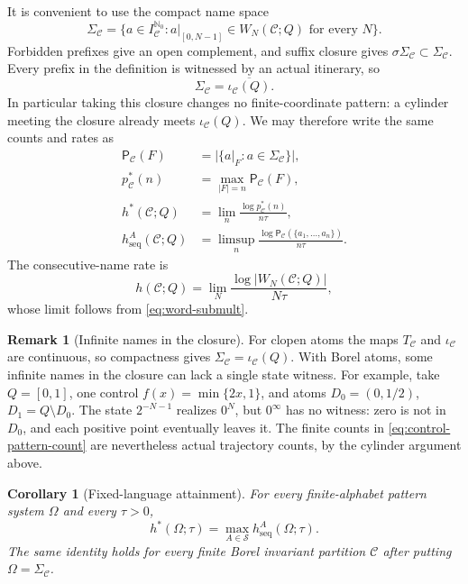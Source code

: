 \documentclass[11pt,reqno]{amsart}
\numberwithin{equation}{section}
\newtheorem{corollary}[theorem]{Corollary}
\theoremstyle{definition}
\newtheorem{remark}[theorem]{Remark}
\theoremstyle{definition}
\newcommand{\Nzero}{\mathbb N_0}
\newcommand{\C}{\mathcal C}
\newcommand{\Patt}{\mathsf P}
\newcommand{\hseq}{h_{\mathrm{seq}}}
\newcommand{\hpat}{h^{*}}
\begin{document}
It is convenient to use the compact name space
\begin{equation}\label{eq:name-system}
 \Sigma_\C=\{a\in I_\C^{\Nzero}:
       a|_{[0,N-1]}\in W_N(\C;Q)\text{ for every }N\}.
\end{equation}
Forbidden prefixes give an open complement, and suffix closure gives
$\sigma\Sigma_\C\subset\Sigma_\C$. Every prefix in the definition
is witnessed by an actual itinerary, so
\begin{equation}\label{eq:itinerary-closure}
 \Sigma_\C=\overline{\iota_\C(Q)}.
\end{equation}
In particular taking this closure changes no finite-coordinate pattern:
a cylinder meeting the closure already meets $\iota_\C(Q)$.
We may therefore write the same counts and rates as
\begin{align}
 \Patt_\C(F)&=|\{a|_F:a\in\Sigma_\C\}|,
       \label{eq:control-pattern-count}\\
 p_\C^*(n)&=\max_{|F|=n}\Patt_\C(F),\label{eq:pstar-control}\\
 \hpat(\C;Q)&=\lim_n\frac{\log p_\C^*(n)}{n\tau},
       \label{eq:hpat-control}\\
 \hseq^A(\C;Q)&=\limsup_n\frac{\log\Patt_\C(\{a_1,\ldots,a_n\})}{n\tau}.
       \label{eq:hseq-control}
\end{align}
The consecutive-name rate is
\begin{equation}\label{eq:ordinary-partition-entropy}
 h(\C;Q)=\lim_N\frac{\log|W_N(\C;Q)|}{N\tau},
\end{equation}
whose limit follows from \eqref{eq:word-submult}.

\begin{remark}[Infinite names in the closure]\label{rem:witness}
For clopen atoms the maps $T_\C$ and $\iota_\C$ are continuous,
so compactness gives $\Sigma_\C=\iota_\C(Q)$. With Borel atoms,
some infinite names in the closure can lack a single state witness.
For example, take $Q=[0,1]$, one control $f(x)=\min\{2x,1\}$,
and atoms $D_0=(0,1/2)$, $D_1=Q\setminus D_0$. The state
$2^{-N-1}$ realizes $0^N$, but $0^\infty$ has no witness:
zero is not in $D_0$, and each positive point eventually leaves it.
The finite counts in \eqref{eq:control-pattern-count} are nevertheless
actual trajectory counts, by the cylinder argument above.
\end{remark}

\begin{corollary}[Fixed-language attainment]\label{cor:fixed}
For every finite-alphabet pattern system $\Omega$ and every $\tau>0$,
\begin{equation}\label{eq:fixed-attainment}
 \hpat(\Omega;\tau)=\max_{A\in\mathscr S}\hseq^A(\Omega;\tau).
\end{equation}
The same identity holds for every finite Borel invariant partition $\C$ after
putting $\Omega=\Sigma_\C$.
\end{corollary}
\end{document}
